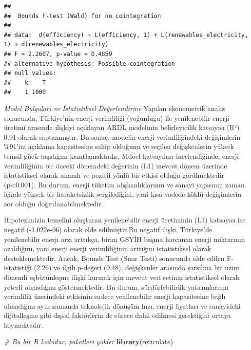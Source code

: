 \documentclass[
]{article}
\newenvironment{Shaded}{\begin{snugshade}}{\end{snugshade}}
\newcommand{\CommentTok}[1]{\textcolor[rgb]{0.56,0.35,0.01}{\textit{#1}}}
\newcommand{\FunctionTok}[1]{\textcolor[rgb]{0.13,0.29,0.53}{\textbf{#1}}}
\newcommand{\NormalTok}[1]{#1}
\begin{document}
\begin{verbatim}
## 
##  Bounds F-test (Wald) for no cointegration
## 
## data:  d(efficiency) ~ L(efficiency, 1) + L(renewables_electricity,     1) + d(renewables_electricity)
## F = 2.2607, p-value = 0.4859
## alternative hypothesis: Possible cointegration
## null values:
##    k    T 
##    1 1000
\end{verbatim}

\emph{Model Bulguları ve İstatistiksel Değerlendirme} Yapılan
ekonometrik analiz sonucunda, Türkiye'nin enerji verimliliği (yoğunluğu)
ile yenilenebilir enerji üretimi arasında ilişkiyi açıklayan ARDL
modelinin belirleyicilik katsayısı (R²) 0.91 olarak saptanmıştır. Bu
sonuç, modelin enerji verimliliğindeki değişimlerin \%91'ini açıklama
kapasitesine sahip olduğunu ve seçilen değişkenlerin yüksek temsil gücü
taşıdığını kanıtlamaktadır. Mdoel katsayıları incelendiğinde, enerji
verimliliğinin bir önceki dönemdeki değerinin (L1) mevcut dönem üzerinde
istatistiksel olarak anamlı ve pozitif yönlü bir etkisi olduğu
görülmektedir (p\textless0.001). Bu durum, enerji tüketim
alışkanlıklarının ve sanayi yapısının zaman içinde yüksek bir
haraketsizlik sergilediğini, yani kısa vadede köklü değişimlerin zor
olduğu doğrulanabilmektedir.

Hipotezimizin temelini oluşturan yenilenebilir enerji üretiminin (L1)
katsayısı ise negatif (-1.022e-06) olarak elde edilmiştir.Bu negatif
ilişki, Türkiye'de yenilenebilir enerji arzı arttıkça, birim GSYİH
başına harcanan enerji miktarının azaldığını, yani enerji enerji
verimliliğinin arttığını istatistiksel olarak desteklemektedir. Ancak,
Bounds Test (Sınır Testi) sonucunda elde edilen F-istatistiği (2.26) ve
ilgili p-değeri (0.48), değişkenler arasında sarsılma bir uzun dönemli
eşbütünleşme ilişki kurmak için mevcut veri setinin istatistiksel olarak
yeterli olmadığını göstermektedir. Bu durum, sürdürlebilirlik
yatırımlarının verimlilik üzerindeki etkisinin sadece yenilenebilir
enerji kapasitesine bağlı olmadığını aynı zamanda teknolojik dönüşüm
hızı, enerji fiyatları ve sanayideki dijitalleşme gibi dışsal
faktörlerin de sürece dahil edilmesi gerektiğini ortaya koymaktadır.

\begin{Shaded}
\begin{Highlighting}[]
\CommentTok{\# Bu bir R kodudur, paketleri yükler}
\FunctionTok{library}\NormalTok{(reticulate)}
\end{Highlighting}
\end{Shaded}
\end{document}
